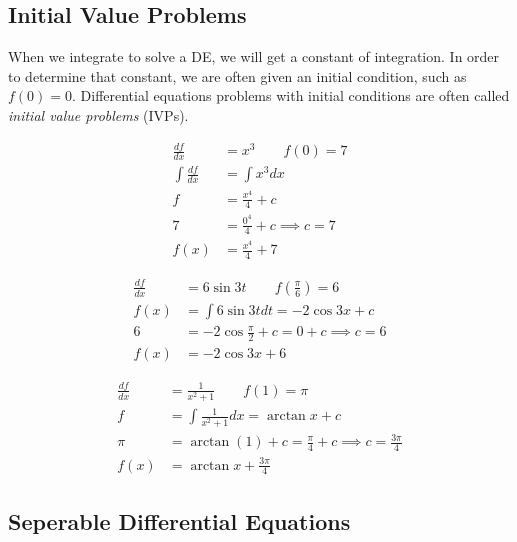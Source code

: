 \documentclass[fleqn]{report}
\begin{document}
\subsection{Initial Value Problems}
\label{ivps}

When we integrate to solve a DE, we will get a constant of integration. 
In order to determine that constant, we are often
given an initial condition, such as $f(0) = 0$.  Differential
equations problems with initial conditions are often called
\emph{initial value problems} (IVPs).

\begin{example}
\begin{align*}
\frac{df}{dx} & = x^3 \quad \quad f(0) = 7 \\
\int \frac{df}{dx} & = \int x^3 dx \\
f & = \frac{x^4}{4} + c \\
7 & = \frac{0^4}{4} + c \implies c = 7 \\
f(x) & = \frac{x^4}{4} + 7 
\end{align*}
\end{example}

\begin{example}
\begin{align*}
\frac{df}{dx} & = 6 \sin 3t \quad \quad f \left( \frac{\pi}{6}
\right) = 6\\
f(x) & = \int 6 \sin 3t dt = -2\cos 3x + c \\
6 & = -2\cos \frac{\pi}{2} + c = 0 + c \implies c=6 \\
f(x) & = -2 \cos 3x + 6 
\end{align*}
\end{example}

\begin{example}
\begin{align*}
\frac{df}{dx} & = \frac{1}{x^2+1} \quad \quad f(1) = \pi \\
f & = \int \frac{1}{x^2+1} dx = \arctan x + c \\
\pi & = \arctan(1) + c = \frac{\pi}{4} + c \implies c =
\frac{3\pi}{4} \\
f(x) & = \arctan x + \frac{3\pi}{4} 
\end{align*}
\end{example}

\subsection{Seperable Differential Equations}
\label{seperable}
\end{document}
